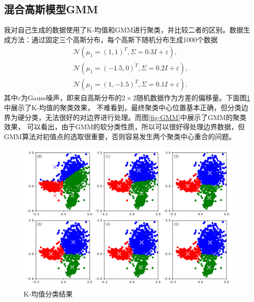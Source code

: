 \documentclass[12pt, a4paper, oneside]{ctexart}
\begin{document}
\subsection{混合高斯模型GMM}
我对自己生成的数据使用了K-均值和GMM进行聚类，并比较二者的区别。数据生成方法：通过固定三个高斯分布，每个高斯下随机分布生成1000个数据
\begin{align*}
&\mathcal{N}\left(\mu_1=(1,1)^T,\Sigma=0.3I+\varepsilon\right),\\
&\mathcal{N}\left(\mu_1=(-1.5,0)^T,\Sigma=0.2I+\varepsilon\right),\\
&\mathcal{N}\left(\mu_1=(1,-1.5)^T,\Sigma=0.1I+\varepsilon\right).
\end{align*}
其中$\varepsilon$为Gauss噪声，即来自高斯分布的$2\times2$随机数据作为方差的偏移量。下面图\ref{fig-Kmeans}中展示了K-均值的聚类效果，
不难看到，最终聚类中心位置基本正确，但分类边界为硬分类，无法很好的对边界进行处理。而图\ref{fig-GMM}中展示了GMM的聚类效果，
可以看出，由于GMM的软分类性质，所以可以很好得处理边界数据，但GMM算法对初值点的选取很重要，否则容易发生两个聚类中心重合的问题。
\begin{figure}[H]
    \hspace{-1.5cm}
    \includegraphics[scale=0.8]{./code/figures/GMM/Kmeans.png}
    \caption{K-均值分类结果}
    \label{fig-Kmeans}
\end{figure}
\end{document}
